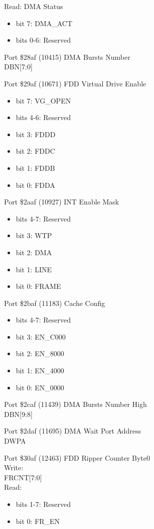 Read: DMA Status
\begin{itemize}
\item[] bit 7: DMA\_ACT
\item[] bits 0-6: Reserved
\end{itemize}

Port \$28af (10415) DMA Bursts Number\\
DBN[7:0]

Port \$29af (10671) FDD Virtual Drive Enable
\begin{itemize}
\item[] bit 7: VG\_OPEN
\item[] bits 4-6: Reserved
\item[] bit 3: FDDD
\item[] bit 2: FDDC
\item[] bit 1: FDDB
\item[] bit 0: FDDA
\end{itemize}

Port \$2aaf (10927) INT Enable Mask
\begin{itemize}
\item[] bits 4-7: Reserved
\item[] bit 3: WTP
\item[] bit 2: DMA
\item[] bit 1: LINE
\item[] bit 0: FRAME
\end{itemize}

Port \$2baf (11183) Cache Config
\begin{itemize}
\item[] bits 4-7: Reserved
\item[] bit 3: EN\_C000
\item[] bit 2: EN\_8000
\item[] bit 1: EN\_4000
\item[] bit 0: EN\_0000
\end{itemize}

Port \$2caf (11439) DMA Bursts Number High\\
DBN[9:8]

Port \$2daf (11695) DMA Wait Port Address\\
DWPA

Port \$30af (12463) FDD Ripper Counter Byte0\\
Write:\\
FRCNT[7:0]\\
Read:
\begin{itemize}
\item[] bits 1-7: Reserved
\item[] bit 0: FR\_EN
\end{itemize}

